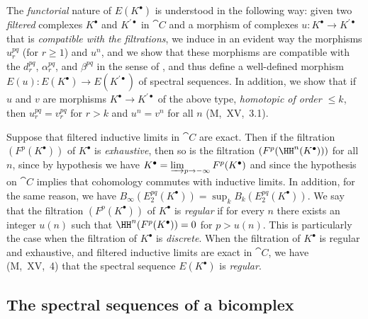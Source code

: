 
\begin{env}[11.2.3]
\label{0.11.2.3}
The \emph{functorial} nature of $E(K^\bullet)$ is understood in the following way: given two \emph{filtered} complexes $K^\bullet$ and $K^{\prime\bullet}$ in $\cat{C}$ and a morphism of complexes $u:K^\bullet\to K^{\prime\bullet}$ that is \emph{compatible with the filtrations}, we induce in an evident way the morphisms $u_r^{pq}$ (for $r\geq 1$) and $u^n$, and we show that these morphisms are compatible with the $d_r^{pq}$, $\alpha_r^{pq}$, and $\beta^{pq}$ in the sense of , and thus define a well-defined morphism $E(u):E(K^\bullet)\to E(K^{\prime\bullet})$ of spectral sequences.
In addition, we show that if $u$ and $v$ are morphisms $K^\bullet\to K^{\prime\bullet}$ of the above type, \emph{homotopic of order $\leq k$}, then $u_r^{pq}=v_r^{pq}$ for $r>k$ and $u^n=v^n$ for all $n$ (M,~XV,~3.1).
\end{env}

\begin{env}[11.2.4]
\label{0.11.2.4}
Suppose that filtered inductive limits in $\cat{C}$ are exact.
Then if the filtration $(F^p(K^\bullet))$ of $K^\bullet$ is \emph{exhaustive}, then so is the filtration $(F^p(\HH^n(K^\bullet)))$ for all $n$, since by hypothesis we have $K^\bullet=\varinjlim_{p\to-\infty}F^p(K^\bullet)$ and since the hypothesis on $\cat{C}$ implies that cohomology commutes with inductive limits.
In addition, for the same reason, we have $B_\infty(E_2^{pq}(K^\bullet))=\sup_k B_k(E_2^{pq}(K^\bullet))$.
We say that the filtration $(F^p(K^\bullet))$ of $K^\bullet$ is \emph{regular} if for every $n$ there exists an integer $u(n)$ such that $\HH^n(F^p(K^\bullet))=0$ for $p>u(n)$.
This is particularly the case when the filtration of $K^\bullet$ is \emph{discrete}.
When the filtration of $K^\bullet$ is regular and exhaustive, and filtered inductive limits are exact in $\cat{C}$, we have (M,~XV,~4) that the spectral sequence $E(K^\bullet)$ is \emph{regular}.
\end{env}

\subsection{The spectral sequences of a bicomplex}
\label{subsection:0.11.3}

